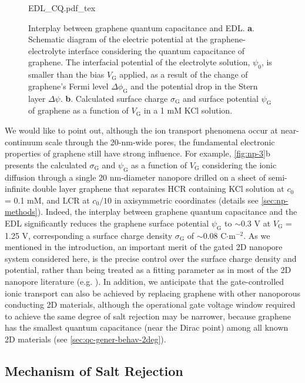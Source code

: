 %
\begin{figure}[!htbp]
  \centering
  {EDL_CQ.pdf_tex}
  \caption{Interplay between graphene quantum capacitance and
    EDL. \textbf{a}. Schematic diagram of the electric potential at
    the graphene-electrolyte interface considering the quantum
    capacitance of graphene. The interfacial potential of the
    electrolyte solution, $\psi_{0}$, is smaller than the bias
    $V_{\mathrm{G}}$ applied, as a result of the change of graphene's
    Fermi level $\Delta \phi_{\mathrm{G}}$ and the potential drop in
    the Stern layer $\Delta \psi$. \textbf{b}. Calculated surface
    charge $\sigma_{\mathrm{G}}$ and surface potential
    $\psi_{\mathrm{G}}$ of graphene as a function of $V_{\mathrm{G}}$
    in a 1 mM KCl solution. }
  \label{fig:np-3}
\end{figure}
We would like to point out, although the ion transport phenomena occur
at near-continuum scale through the 20-nm-wide pores, the fundamental
electronic properties of graphene still have strong influence.
%
For
example, \autoref{fig:np-3}b presents the calculated
$\sigma_{\mathrm{G}}$ and $\psi_{\mathrm{G}}$ as a function of
$V_{\mathrm{G}}$ considering the ionic diffusion through a single 20
nm-diameter nanopore drilled on a sheet of semi-infinite double layer
graphene that separates HCR containing KCl solution at $c_{0}$ = 0.1
mM, and LCR at $c_{0}/10$ in axisymmetric coordinates (details see \autoref{sec:np-methods}). Indeed, the
interplay between graphene quantum capacitance and the EDL
significantly reduces the graphene surface potential
$\psi_{\mathrm{G}}$ to $\sim$0.3 V at $V_{\mathrm{G}}$ = 1.25 V,
corresponding a surface charge density $\sigma_{\mathrm{G}}$ of
$\sim$0.08 C$\cdot$m$^{-2}$.
As we mentioned in the introduction, an
important merit of the gated 2D nanopore system considered here,
is the precise control over the
surface charge density and potential,
rather than being treated as a fitting parameter as in most of the 2D
nanopore literature (e.g. \autocite{Rollings_2016_gating}).
%
In addition, we anticipate that the gate-controlled ionic transport
can also be achieved by replacing graphene with other nanoporous
conducting 2D materials, although the operational gate voltage window
required to achieve the same degree of salt rejection may be narrower,
because graphene has the smallest quantum capacitance (near the Dirac
point) among all known 2D materials (see
\autoref{sec:qc-gener-behav-2deg}).

\subsection{Mechanism of Salt Rejection}
\label{sec:np-mechanism}

